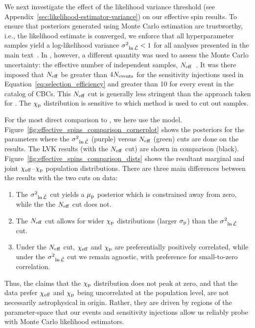 We next investigate the effect of the likelihood variance threshold (see Appendix~\ref{sec:likelihood-estimator-variance}) on our \parametricAdj effective spin results. 
To ensure that posteriors generated using Monte Carlo estimation are trustworthy, i.e., the likelihood estimate is converged, we enforce that all hyperparameter samples yield a log-likelihood variance ${\sigma^2}_{\ln\cal \hat L} < 1$ for all analyses presented in the main text~\citep{Talbot:2023pex}.
In \gwtcthree, however, a different quantity was used to assess the Monte Carlo uncertainty: the effective number of independent samples, $N_{\rm eff}$~\citep{Farr:2019rap}. 
It was there imposed that $N_{\rm eff}$ be greater than $4 N_{\rm events}$ for the sensitivity injections used in Equation~\eqref{eq:selection_efficiency} and greater than 10 for every event in the catalog of CBCs. 
This $N_{\rm eff}$ cut is generally less stringent than the approach taken for \gwtcfour. 
The $\chi_\mathrm{p}$ distribution is sensitive to which method is used to cut out samples.

For the most direct comparison to \gwtcthree, we here use the \effectiveSpinModel model.
Figure~\ref{fig:effective_spins_comparison_cornerplot} shows the posteriors for the \effectiveSpinModel parameters where the ${\sigma^2}_{\ln\cal \hat L}$ (purple) versus  $N_{\rm eff}$ (green) cuts are done on the \gwtcfour results. 
The LVK \gwtcthree results (with the $N_{\rm eff}$ cut) are shown in comparison (black). 
Figure~\ref{fig:effective_spins_comparison_dists} shows the resultant marginal and joint $\chi_{\rm eff}$--$\chi_\mathrm{p}$ population distributions. 
There are three main differences between the results with the two cuts on \gwtcfour data: 
\begin{enumerate}
	\item The ${\sigma^2}_{\ln\cal \hat L}$ cut yields a $\mu_{\rm p}$ posterior which is constrained away from zero, while the the $N_{\rm eff}$ cut does not.
	\item The $N_{\rm eff}$ cut allows for wider $\chi_\mathrm{p}$ distributions (larger $\sigma_{\rm p}$) than the ${\sigma^2}_{\ln\cal \hat L}$ cut. 
	\item Under the $N_{\rm eff}$ cut, $\chi_{\rm eff}$ and $\chi_\mathrm{p}$ are preferentially positively correlated, while under the ${\sigma^2}_{\ln\cal \hat L}$ cut we remain agnostic, with preference for small-to-zero correlation.
\end{enumerate}
Thus, the claims that the $\chi_\mathrm{p}$ distribution does not peak at zero, and that the data prefer $\chi_{\rm eff}$ and $\chi_\mathrm{p}$ being uncorrelated at the population level, are not necessarily astrophysical in origin.
Rather, they are driven by regions of the parameter-space that our events and sensitivity injections allow us reliably probe with Monte Carlo likelihood estimators. 

